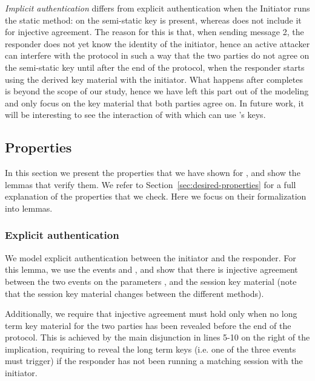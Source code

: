 \emph{Implicit authentication} differs from explicit authentication when the
Initiator runs the static method: on  the semi-static key \mGiy{} is
present, whereas  does not include it for injective agreement.
%
The reason for this is that, when sending message 2, the responder does not yet
know the identity of the initiator, hence an active attacker can interfere with
the protocol in such a way that the two parties do not agree on the semi-static
key \mGiy{} until after the end of the protocol, when the responder starts using
the derived key material with the initiator.
%
What happens after \mEdhoc{} completes is beyond the scope of our study, hence
we have left this part out of the modeling and only focus on the key material
that both parties agree on.
%
In future work, it will be interesting to see the interaction of \mEdhoc{} with
\mOscore{} which can use \mEdhoc{}'s keys.

\spacehack
\subsection{Properties}
\label{sec:properties}
\fillhack{}
In this section we present the properties that we have shown for \mEdhoc, and
show the lemmas that verify them. We refer to
Section~\ref{sec:desired-properties} for a full explanation of the properties
that we check. Here we focus on their formalization into \mTamarin{} lemmas.

\spacehack
\subsubsection{Explicit authentication}

We model explicit authentication between the initiator and the
responder.
%
For this lemma, we use the events  and
, and show that there is injective agreement
between the two events on the parameters ,
 and the session key material  (note
that the session key material changes between the different \mEdhoc{}
methods).

Additionally, we require that injective agreement must hold only when
no long term key material for the two parties has been revealed before
the end of the protocol.
%
This is achieved by the main disjunction in lines 5-10 on the right of
the implication, requiring to reveal the long term keys (i.e. one of
the three  events must trigger) if the responder has
not been running a matching session with the initiator.

